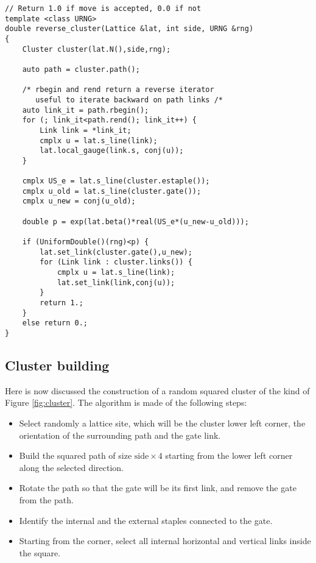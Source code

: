 \begin{lstlisting}[caption={Reverse cluster update}]
// Return 1.0 if move is accepted, 0.0 if not
template <class URNG>
double reverse_cluster(Lattice &lat, int side, URNG &rng)
{
    Cluster cluster(lat.N(),side,rng);

    auto path = cluster.path();

    /* rbegin and rend return a reverse iterator
       useful to iterate backward on path links /*
    auto link_it = path.rbegin();
    for (; link_it<path.rend(); link_it++) {
        Link link = *link_it;
        cmplx u = lat.s_line(link);
        lat.local_gauge(link.s, conj(u));
    }

    cmplx US_e = lat.s_line(cluster.estaple());
    cmplx u_old = lat.s_line(cluster.gate());
    cmplx u_new = conj(u_old);

    double p = exp(lat.beta()*real(US_e*(u_new-u_old)));

    if (UniformDouble()(rng)<p) {
        lat.set_link(cluster.gate(),u_new);
        for (Link link : cluster.links()) {
            cmplx u = lat.s_line(link);
            lat.set_link(link,conj(u));
        }
        return 1.;
    }
    else return 0.;
}
\end{lstlisting}

\subsection*{Cluster building}

Here is now discussed the construction of a random squared cluster of the kind of Figure \ref{fig:cluster}.
The algorithm is made of the following steps:

\begin{itemize}
    \item
        Select randomly a lattice site, which will be the cluster lower left corner,
        the orientation of the surrounding path and the gate link.
    \item
        Build the squared path of size $\mathrm{side}\times 4$ starting from the lower left corner along the selected direction.
    \item
        Rotate the path so that the gate will be its first link,
        and remove the gate from the path.
    \item Identify the internal and the external staples connected to the gate.
    \item
        Starting from the corner, select all internal horizontal and vertical links inside the square.
\end{itemize}

